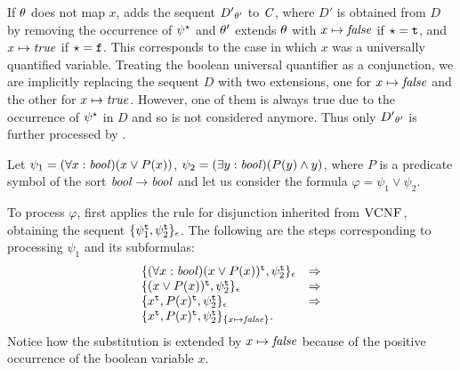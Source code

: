 If $\theta$ does not map $x$, \nfcnf{} adds the sequent ${D'}_{\theta'}$ to $\mathit{C}$, where $D'$ is obtained from $D$ by removing the occurrence of ${\psi}^{\star}$ and $\theta'$ extends $\theta$ with $x \mapsto \mathit{false}$ if $\star=\mathtt{t}$, and $x \mapsto \mathit{true}$ if $\star=\mathtt{f}$. 
This corresponds to the case in which $x$ was a universally quantified variable.
Treating the boolean universal quantifier as a conjunction, we are implicitly replacing the sequent $D$ with two extensions, one for $x \mapsto \mathit{false}$ and the other for $x \mapsto \mathit{true}$. However, one of them is always true due to the occurrence of ${\psi}^{\star}$ in $D$ and so is not considered anymore. Thus only ${D'}_{\theta'}$ is further processed by \nfcnf{}.

\begin{example} Let $\psi_1 = (\forall x:\mathit{bool})(x \lor P(x))$, $\psi_2 = (\exists y:\mathit{bool})(P(y) \land y)$,
where $P$ is a predicate symbol of the sort $\mathit{bool} \to \mathit{bool}$ and let us consider the formula $\varphi = \psi_1 \lor \psi_2$.

To process $\varphi$, \nfcnf{} first applies the rule for disjunction inherited from $\textsc{VCNF}$,
obtaining the sequent $\{\psi_1^{\mathtt{t}}, \psi_2^{\mathtt{t}}\}_\epsilon$. The following are the steps corresponding to processing 
$\psi_1$ and its subformulas:
\[
\begin{array}{ll}
\{(\forall x:\mathit{bool})(x \lor P(x))^{\mathtt{t}}, \psi_2^{\mathtt{t}}\}_\epsilon & \Rightarrow \\
\{(x \lor P(x))^{\mathtt{t}}, \psi_2^{\mathtt{t}}\}_\epsilon & \Rightarrow \\
\{x^{\mathtt{t}}, P(x)^{\mathtt{t}}, \psi_2^{\mathtt{t}}\}_\epsilon & \Rightarrow \\
\{x^{\mathtt{t}}, P(x)^{\mathtt{t}}, \psi_2^{\mathtt{t}}\}_{\{x \mapsto \mathit{false}\}}.\\
\end{array}
\]
Notice how the substitution is extended by $x \mapsto \mathit{false}$ because of the positive occurrence of the boolean variable $x$.


\end{example}
